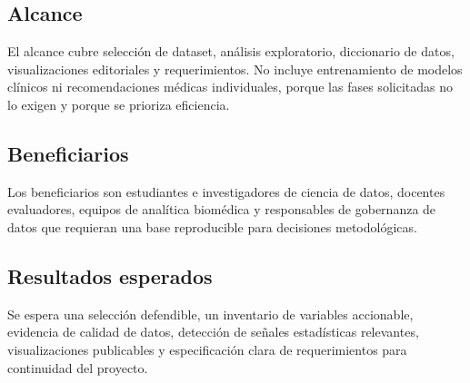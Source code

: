 \documentclass[11pt,a4paper]{article}
\begin{document}
\subsection{Alcance}
El alcance cubre selección de dataset, análisis exploratorio, diccionario de datos, visualizaciones editoriales y requerimientos. No incluye entrenamiento de modelos clínicos ni recomendaciones médicas individuales, porque las fases solicitadas no lo exigen y porque se prioriza eficiencia.

\subsection{Beneficiarios}
Los beneficiarios son estudiantes e investigadores de ciencia de datos, docentes evaluadores, equipos de analítica biomédica y responsables de gobernanza de datos que requieran una base reproducible para decisiones metodológicas.

\subsection{Resultados esperados}
Se espera una selección defendible, un inventario de variables accionable, evidencia de calidad de datos, detección de señales estadísticas relevantes, visualizaciones publicables y especificación clara de requerimientos para continuidad del proyecto.
\end{document}
